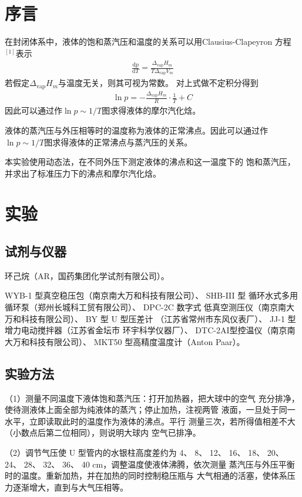 \documentclass[12pt]{ctexart}
\numberwithin{equation}{section}
\begin{document}
\section{序言}

在封闭体系中，液体的饱和蒸汽压和温度的关系可以用Clausius-Clapeyron
方程$^{[1]}$表示
\begin{align}
    \frac{\mathrm{d}p}{\mathrm{d}T}
    = \frac{\Delta_{\text{vap}}H_m}{T\Delta_{\text{vap}}V_m}
\end{align}
若假定$\Delta_{\text{vap}} H_m$与温度无关，则其可视为常数。
对上式做不定积分得到
\begin{align}
    \ln p = -\frac{\Delta_{\text{vap}}H_m}{R}\cdot\frac{1}{T} + C
\end{align}
因此可以通过作$\ln p \sim 1/T$图求得液体的摩尔汽化焓。

液体的蒸汽压与外压相等时的温度称为液体的正常沸点。因此可以通过作
$\ln p \sim 1/T$图求得液体的正常沸点与蒸汽压的关系。

本实验使用动态法，在不同外压下测定液体的沸点和这一温度下的
饱和蒸汽压，并求出了标准压力下的沸点和摩尔汽化焓。

\section{实验}
\subsection{试剂与仪器}
环己烷（AR，国药集团化学试剂有限公司）。

WYB-1 型真空稳压包（南京南大万和科技有限公司）、 SHB-III 型
循环水式多用循环泵（郑州长城科工贸有限公司）、 DPC-2C 数字式
低真空测压仪（南京南大万和科技有限公司）、 BY 型 U 型压差计
（江苏省常州市东风仪表厂）、 JJ-1 型增力电动搅拌器（江苏省金坛市
环宇科学仪器厂）、 DTC-2AI型控温仪（南京南大万和科技有限公司）、
MKT50 型高精度温度计（Anton Paar）。

\subsection{实验方法}

（1）测量不同温度下液体饱和蒸汽压：打开加热器，把大球中的空气
充分排净，使待测液体上面全部为纯液体的蒸汽；停止加热，注视两管
液面，一旦处于同一水平，立即读取此时的温度作为液体的沸点。平行
测量三次，若所得值相差不大（小数点后第二位相同），则说明大球内
空气已排净。

（2）调节气压使 U 型管内的水银柱高度差约为 4、 8、 12、 16、 18、
20、 24、 28、 32、 36、 40 cm，调整温度使液体沸腾，依次测量
蒸汽压与外压平衡时的温度。重新加热，并在加热的同时控制稳压瓶与
大气相通的活塞，使体系压力逐渐增大，直到与大气压相等。
\end{document}
